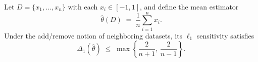Let $D=\{x_1,\ldots,x_n\}$ with each $x_i\in[-1,1]$, and define the mean estimator
\[
\hat\theta(D)\;=\;\frac{1}{n}\sum_{i=1}^n x_i.
\]
Under the add/remove notion of neighboring datasets, its $\ell_1$ sensitivity satisfies
\[
\Delta_1(\hat\theta)\;\le\;\max\left\{\frac{2}{n+1},\,\frac{2}{n-1}\right\}.
\]